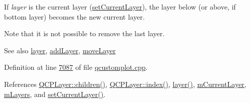 If {\itshape layer} is the current layer (\hyperlink{a00116_a23a4d3cadad1a0063c5fe19aac5659e6}{set\+Current\+Layer}), the layer below (or above, if bottom layer) becomes the new current layer.

Note that it is not possible to remove the last layer.

\begin{DoxySeeAlso}{See also}
\hyperlink{a00116_a1b7efcbaf6ed6181f1a28f3d486f8837}{layer}, \hyperlink{a00116_acfae623ec58e4f9e35014062580e4720}{add\+Layer}, \hyperlink{a00116_ad18d1ff9086f2e658b81d67d3c84a0c3}{move\+Layer} 
\end{DoxySeeAlso}


Definition at line \hyperlink{a00115_source_l07087}{7087} of file \hyperlink{a00115_source}{qcustomplot.\+cpp}.



References \hyperlink{a00116_source_l00304}{Q\+C\+P\+Layer\+::children()}, \hyperlink{a00115_source_l13884}{Q\+C\+P\+Layer\+::index()}, \hyperlink{a00116_ae576ada60c1133318e29348d43d3cf10}{layer()}, \hyperlink{a00116_source_l02139}{m\+Current\+Layer}, \hyperlink{a00116_source_l02118}{m\+Layers}, and \hyperlink{a00115_source_l06998}{set\+Current\+Layer()}.


